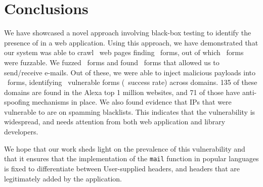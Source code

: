 \section{Conclusions}
\vspace{-2.5ex}
We have showcased a novel approach involving black-box testing to identify the presence of \ehi in a web application. Using this approach, we have demonstrated that our system was able to crawl \urls\ web pages finding \forms\ forms, out of which \emailforms\ forms were fuzzable. We fuzzed \fuzzed\ forms and found \recd\  forms that allowed us to send/receive e-mails. Out of these, we were able to inject malicious payloads into \malfuzzed\ forms, identifying \success\ vulnerable forms (\successDelta\ success rate) across \domains domains. 135 of these domains are found in the Alexa top 1 million websites, and 71 of those have anti-spoofing mechanisms in place. We also found evidence that \ipsblacklist IPs that were vulnerable to \ehi are on spamming blacklists. This indicates that the vulnerability is widespread, and needs attention from both web application and library developers. 

We hope that our work sheds light on the prevalence of this vulnerability and that it ensures that the implementation of the \texttt{mail} function in popular languages is fixed to differentiate between User-supplied headers, and headers that are legitimately added by the application.
